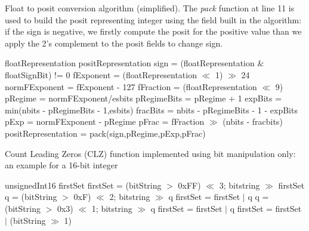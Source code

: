 \begin{algorithm}
 \caption{Float to posit conversion algorithm (simplified). The \textit{pack} function at line 11 is used to build the posit representing integer using the field built in the algorithm: if the sign is negative, we firstly compute the posit for the positive value than we apply the 2's complement to the posit fields to change sign.}
 \label{alg:positenc}
 \begin{algorithmic}[1]
 \renewcommand{\algorithmicrequire}{\textbf{Input:}}
 \renewcommand{\algorithmicensure}{\textbf{Output:}}
 \Require floatRepresentation
 \Ensure positRepresentation
\State sign = (floatRepresentation \& floatSignBit) != 0
\State fExponent = (floatRepresentation $\ll$ 1) $\gg$ 24
\State normFExponent = fExponent - 127
\State fFraction = (floatRepresentation $\ll$ 9) 
\State pRegime = normFExponent/esbits
\State pRegimeBits = pRegime + 1
\State expBits = min(nbits - pRegimeBits - 1,esbits)
\State fracBits = nbits - pRegimeBits - 1 - expBits
\State pExp = normFExponent - pRegime 
\State pFrac = fFraction $\gg$ (nbits - fracbits)
\State positRepresentation = pack(sign,pRegime,pExp,pFrac)
\end{algorithmic} 
\end{algorithm}

\begin{algorithm}
 \caption{ Count Leading Zeros (CLZ) function implemented using bit manipulation only: an example for a 16-bit integer}
 \label{alg:clz}
 \begin{algorithmic}[1]
   \renewcommand{\algorithmicrequire}{\textbf{Input:}}
 \renewcommand{\algorithmicensure}{\textbf{Output:}}
 \Require unsignedInt16
 \Ensure firstSet
  \State firstSet = (bitString $>$ 0xFF) $\ll$ 3; bitstring $\gg$ firstSet
  \State q = (bitString $>$ 0xF) $\ll$ 2; bitstring $\gg$ q
  \State firstSet = firstSet $|$ q
  \State q = (bitString $>$ 0x3) $\ll$ 1; bitstring $\gg$ q
  \State firstSet = firstSet $|$ q
  \State firstSet = firstSet $|$ (bitString $\gg$ 1)
 \end{algorithmic}
\end{algorithm}



